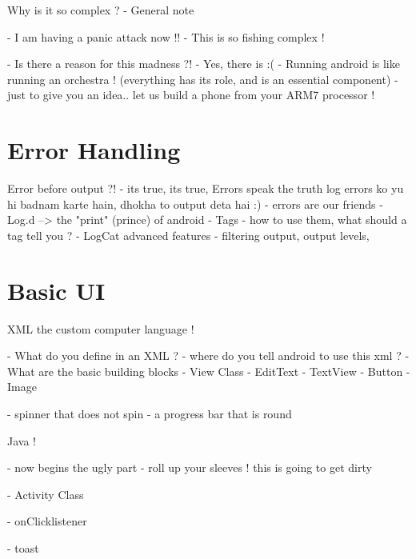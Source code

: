 \documentclass[11pt]{beamer}
\begin{document}
\begin{frame}[containsverbatim]{Why is it so complex ? - General note}

- I am having a panic attack now !!
- This is so fishing complex ! 

- Is there a reason for this madness ?!
- Yes, there is :(
- Running android is like running an orchestra !
(everything has its role, and is an essential component)
- just to give you an idea.. let us build a phone from your ARM7 processor !

\end{frame}

\section{Error Handling}

\begin{frame}[containsverbatim]{Error before output ?!}
- its true, its true, Errors speak the truth
log errors ko yu hi badnam karte hain, dhokha to output deta hai :)
- errors are our friends
- Log.d --> the "print" (prince) of android 
- Tags - how to use them, what should a tag tell you ?
- LogCat advanced features - filtering output, output levels, 

\end{frame}

\section{Basic UI}

\begin{frame}[containsverbatim]{XML the custom computer language !}

- What do you define in an XML ?
- where do you tell android to use this xml ?
- What are the basic building blocks
- View Class
- EditText
- TextView
- Button
- Image 

- spinner that does not spin 
- a progress bar that is round
\end{frame}



\begin{frame}[containsverbatim]{Java !}

- now begins the ugly part 
- roll up your sleeves ! this is going to get dirty


- Activity Class

- onClicklistener

- toast 
\end{frame}
\end{document}
